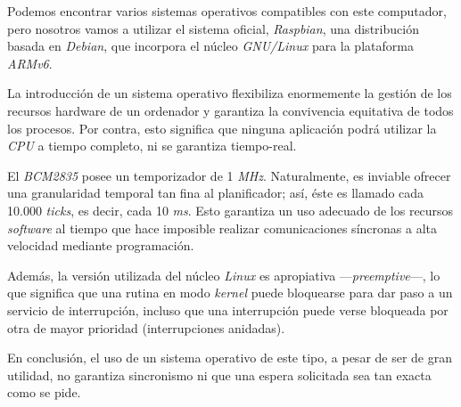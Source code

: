 Podemos encontrar varios sistemas operativos compatibles con este computador, pero nosotros vamos a utilizar el sistema oficial, \textit{Raspbian}, una distribución basada en \textit{Debian}, que incorpora el núcleo \textit{GNU/Linux} para la plataforma \textit{ARMv6}.

La introducción de un sistema operativo flexibiliza enormemente la gestión de los recursos hardware de un ordenador y garantiza la convivencia equitativa de todos los procesos. Por contra, esto significa que ninguna aplicación podrá utilizar la \textit{CPU} a tiempo completo, ni se garantiza tiempo-real.

El \textit{BCM2835} posee un temporizador de 1 \textit{MHz}. Naturalmente, es inviable ofrecer una granularidad temporal tan fina al planificador; así, éste es llamado cada 10.000 \textit{ticks}, es decir, cada 10 \textit{ms}. Esto garantiza un uso adecuado de los recursos \textit{software} al tiempo que hace imposible realizar comunicaciones síncronas a alta velocidad mediante programación.

Además, la versión utilizada del núcleo \textit{Linux} es apropiativa ---\textit{preemptive}---, lo que significa que una rutina en modo \textit{kernel} puede bloquearse para dar paso a un servicio de interrupción, incluso que una interrupción puede verse bloqueada por otra de mayor prioridad (interrupciones anidadas).

En conclusión, el uso de un sistema operativo de este tipo, a pesar de ser de gran utilidad, no garantiza sincronismo ni que una espera solicitada sea tan exacta como se pide.